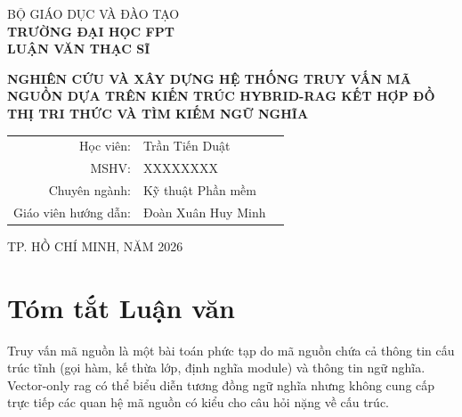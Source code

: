 \documentclass[12pt,a4paper,oneside]{report}
\begin{document}
\begin{titlepage}
    \begin{center}
        \large BỘ GIÁO DỤC VÀ ĐÀO TẠO \\
        \textbf{\large TRƯỜNG ĐẠI HỌC FPT} \\
        \vfill
        \textbf{\Large LUẬN VĂN THẠC SĨ} \\
        \vfill
        \begin{singlespace}
            \textbf{\Large NGHIÊN CỨU VÀ XÂY DỰNG HỆ THỐNG TRUY VẤN MÃ NGUỒN DỰA TRÊN KIẾN TRÚC HYBRID-RAG KẾT HỢP ĐỒ THỊ TRI THỨC VÀ TÌM KIẾM NGỮ NGHĨA}
        \end{singlespace}
        \vfill
        \vspace{1.5cm}
        \begin{tabular}{rll}
            Học viên: & Trần Tiến Duật \\
            MSHV: & XXXXXXXX \\
            Chuyên ngành: & Kỹ thuật Phần mềm \\
            Giáo viên hướng dẫn: & Đoàn Xuân Huy Minh \\
        \end{tabular}
        \vfill
        \large TP. HỒ CHÍ MINH, NĂM 2026
    \end{center}
\end{titlepage}

\tableofcontents
\newpage
\listoffigures
\newpage
\listoftables
\newpage
\printglossary[type=\acronymtype, title=Danh mục từ viết tắt]
\newpage

\chapter*{Tóm tắt Luận văn}
Truy vấn mã nguồn là một bài toán phức tạp do mã nguồn chứa cả thông tin cấu trúc tĩnh (gọi hàm, kế thừa lớp, định nghĩa module) và thông tin ngữ nghĩa. Vector-only \gls{rag} có thể biểu diễn tương đồng ngữ nghĩa nhưng không cung cấp trực tiếp các quan hệ mã nguồn có kiểu cho câu hỏi nặng về cấu trúc.
\end{document}
